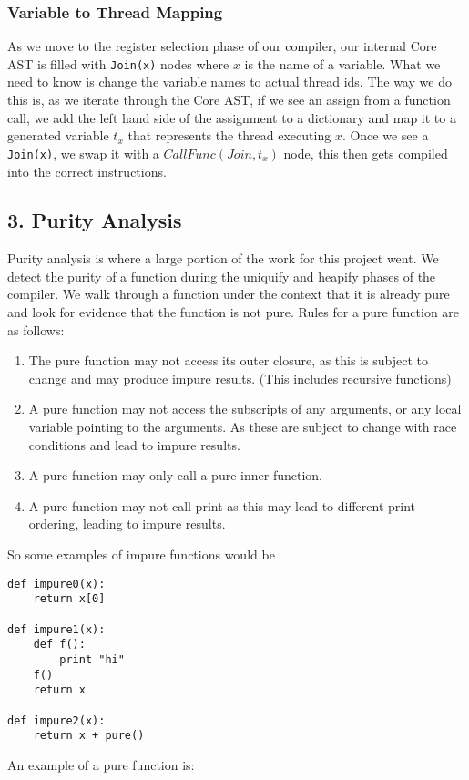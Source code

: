 \documentclass{acm_proc_article-sp}
\begin{document}
\subsubsection*{Variable to Thread Mapping}

As we move to the register selection phase of our compiler, our internal Core
AST is filled with \verb|Join(x)| nodes where $x$ is the name of a variable.
What we need to know is change the variable names to actual thread ids. The way
we do this is, as we iterate through the Core AST, if we see an assign from a
function call, we add the left hand side of the assignment to a dictionary and
map it to a generated variable $t_x$ that represents the thread executing $x$.
Once we see a \verb|Join(x)|, we swap it with a $CallFunc(Join, t_x)$ node,
this then gets compiled into the correct instructions.


\subsection*{3. Purity Analysis}

Purity analysis is where a large portion of the work for this project went. We
detect the purity of a function during the uniquify and heapify phases of the
compiler. We walk through a function under the context that it is already pure
and look for evidence that the function is not pure. Rules for a pure function
are as follows:

\begin{enumerate} 

\item The pure function may not access its outer closure, as
this is subject to change and may produce impure results. (This includes
recursive functions) \item A pure function may not access the subscripts of any
arguments, or any local variable pointing to the arguments. As these are
subject to change with race conditions and lead to impure results.  \item A
pure function may only call a pure inner function.  \item A pure function may
not call print as this may lead to different print ordering, leading to impure
results.  \end{enumerate}

So some examples of impure functions would be 

\begin{verbatim}
def impure0(x):
    return x[0]

def impure1(x):
    def f():
        print "hi"
    f()
    return x

def impure2(x):
    return x + pure()
\end{verbatim}

An example of a pure function is:

\begin{verbatim}
\end{verbatim}
\end{document}
